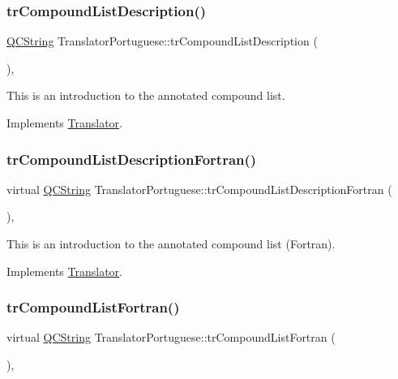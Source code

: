 \subsubsection{\texorpdfstring{trCompoundListDescription()}{trCompoundListDescription()}}
{\footnotesize\ttfamily \mbox{\hyperlink{class_q_c_string}{Q\+C\+String}} Translator\+Portuguese\+::tr\+Compound\+List\+Description (\begin{DoxyParamCaption}{ }\end{DoxyParamCaption})\hspace{0.3cm}{\ttfamily [inline]}, {\ttfamily [virtual]}}

This is an introduction to the annotated compound list. 

Implements \mbox{\hyperlink{class_translator}{Translator}}.

\mbox{\label{class_translator_portuguese_a1e8ca72a3baecb7a7de0efea29c1e607}} 
\subsubsection{\texorpdfstring{trCompoundListDescriptionFortran()}{trCompoundListDescriptionFortran()}}
{\footnotesize\ttfamily virtual \mbox{\hyperlink{class_q_c_string}{Q\+C\+String}} Translator\+Portuguese\+::tr\+Compound\+List\+Description\+Fortran (\begin{DoxyParamCaption}{ }\end{DoxyParamCaption})\hspace{0.3cm}{\ttfamily [inline]}, {\ttfamily [virtual]}}

This is an introduction to the annotated compound list (Fortran). 

Implements \mbox{\hyperlink{class_translator}{Translator}}.

\mbox{\label{class_translator_portuguese_a5b6d246dc1df2ca8c62f69594858a4ce}} 
\subsubsection{\texorpdfstring{trCompoundListFortran()}{trCompoundListFortran()}}
{\footnotesize\ttfamily virtual \mbox{\hyperlink{class_q_c_string}{Q\+C\+String}} Translator\+Portuguese\+::tr\+Compound\+List\+Fortran (\begin{DoxyParamCaption}{ }\end{DoxyParamCaption})\hspace{0.3cm}{\ttfamily [inline]}, {\ttfamily [virtual]}}

